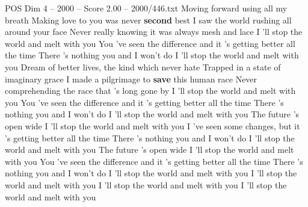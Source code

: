 \begin{textsample}{POS Dim 4 – 2000 – Score 2.00 – 2000/446.txt}  \label{ex:f4_pos_011}
Moving forward using all my breath Making love to you was never \textbf{second} best I saw the world rushing all around your face Never really knowing it was always mesh and lace I 'll stop the world and melt with you You 've seen the difference and it 's getting better all the time There 's nothing you and I won't do I 'll stop the world and melt with you Dream of better lives, the kind which never hate Trapped in a state of imaginary grace I made a pilgrimage to \textbf{save} this human race Never comprehending the race that 's long gone by I 'll stop the world and melt with you You 've seen the difference and it 's getting better all the time There 's nothing you and I won't do I 'll stop the world and melt with you The future 's open wide I 'll stop the world and melt with you I 've seen some changes, but it 's getting better all the time There 's nothing you and I won't do I 'll stop the world and melt with you The future 's open wide I 'll stop the world and melt with you You 've seen the difference and it 's getting better all the time There 's nothing you and I won't do I 'll stop the world and melt with you I 'll stop the world and melt with you I 'll stop the world and melt with you I 'll stop the world and melt with you

\end{textsample}
